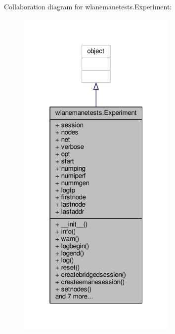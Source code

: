 Collaboration diagram for wlanemanetests.\+Experiment\+:
\nopagebreak
\begin{figure}[H]
\begin{center}
\leavevmode
\includegraphics[width=220pt]{classwlanemanetests_1_1_experiment__coll__graph}
\end{center}
\end{figure}
